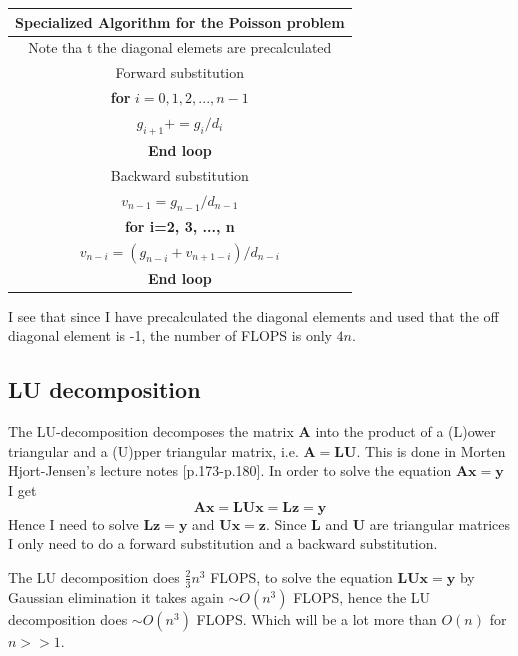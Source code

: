 \documentclass[12pt]{article}
\begin{document}
\begin{center}
  \begin{tabular}{||c||}
    \hline\hline
    \textbf{Specialized Algorithm for the Poisson problem}\\
    \hline\hline Note tha
    t the diagonal elemets are precalculated\\
    Forward substitution \\
    \textbf{for} $i=0,1,2,...,n-1$\\
      $g_{i+1}+=g_i/d_i$\\
      \textbf{End loop} \\
      Backward substitution \\
      $v_{n-1}=g_{n-1}/d_{n-1}$\\
      \textbf{for i=2, 3, ..., n} \\
      $v_{n-i}=(g_{n-i}+v_{n+1-i})/d_{n-i}$\\ 
      \textbf{End loop}\\
      \hline\hline
  \end{tabular}
\end{center}
 I see that since I have precalculated the diagonal elements and used that the off diagonal element is -1, the number of FLOPS is only $4n$.

\subsection{LU decomposition}
The LU-decomposition decomposes the matrix $\mathbf{A}$ into the product of a (L)ower triangular and a (U)pper triangular matrix, i.e. $\mathbf{A}=\mathbf{L}\mathbf{U}$. This is done in Morten Hjort-Jensen's lecture notes \cite{morten}[p.173-p.180]. In order to solve the equation $\mathbf{A}\mathbf{x}=\mathbf{y}$ I get $$\mathbf{A}\mathbf{x}=\mathbf{L}\mathbf{U}\mathbf{x}=\mathbf{L}\mathbf{z}=\mathbf{y} $$
Hence I need to solve $\mathbf{L}\mathbf{z}=\mathbf{y}$ and $\mathbf{U}\mathbf{x}=\mathbf{z}$. Since $\mathbf{L}$ and $\mathbf{U}$ are triangular matrices I only need to do a forward substitution and a backward substitution. 

The LU decomposition does $\frac{2}{3}n^3$ FLOPS, to solve the equation $\mathbf{L}\mathbf{U}\mathbf{x}=\mathbf{y}$ by Gaussian elimination it takes again $\sim O(n^3)$ FLOPS, hence the LU decomposition does $\sim O(n^3)$ FLOPS. Which will be a lot more than $O(n)$ for $n>>1$.
\end{document}
